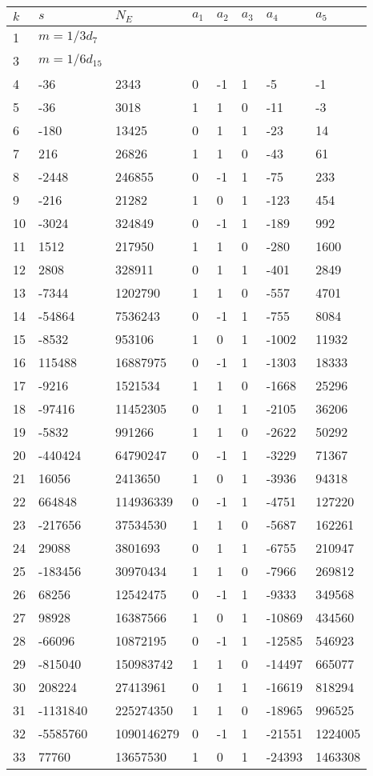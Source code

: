 \documentclass{amsart}
\begin{document}
\begin{longtable}{|l|l|l|lllll|}
\hline
$k$ & $s$ & $N_E$ & $a_1$ & $a_2$ & $a_3$ & $a_4$ & $a_5$\\
\hline
1&$m=1/3d_{7}$&&\multicolumn{5}{c|}{}\\
3&$m=1/6d_{15}$&&\multicolumn{5}{c|}{}\\
4&-36&2343&0&-1&1&-5&-1\\
5&-36&3018&1&1&0&-11&-3\\
6&-180&13425&0&1&1&-23&14\\
7&216&26826&1&1&0&-43&61\\
8&-2448&246855&0&-1&1&-75&233\\
9&-216&21282&1&0&1&-123&454\\
10&-3024&324849&0&-1&1&-189&992\\
11&1512&217950&1&1&0&-280&1600\\
12&2808&328911&0&1&1&-401&2849\\
13&-7344&1202790&1&1&0&-557&4701\\
14&-54864&7536243&0&-1&1&-755&8084\\
15&-8532&953106&1&0&1&-1002&11932\\
16&115488&16887975&0&-1&1&-1303&18333\\
17&-9216&1521534&1&1&0&-1668&25296\\
18&-97416&11452305&0&1&1&-2105&36206\\
19&-5832&991266&1&1&0&-2622&50292\\
20&-440424&64790247&0&-1&1&-3229&71367\\
21&16056&2413650&1&0&1&-3936&94318\\
22&664848&114936339&0&-1&1&-4751&127220\\
23&-217656&37534530&1&1&0&-5687&162261\\
24&29088&3801693&0&1&1&-6755&210947\\
25&-183456&30970434&1&1&0&-7966&269812\\
26&68256&12542475&0&-1&1&-9333&349568\\
27&98928&16387566&1&0&1&-10869&434560\\
28&-66096&10872195&0&-1&1&-12585&546923\\
29&-815040&150983742&1&1&0&-14497&665077\\
30&208224&27413961&0&1&1&-16619&818294\\
31&-1131840&225274350&1&1&0&-18965&996525\\
32&-5585760&1090146279&0&-1&1&-21551&1224005\\
33&77760&13657530&1&0&1&-24393&1463308\\

\end{longtable}
\end{document}
